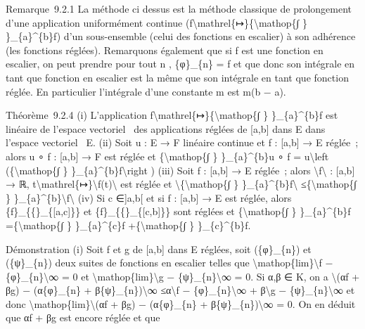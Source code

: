 \documentclass[]{article}
\begin{document}
Remarque~9.2.1 La méthode ci dessus est la méthode classique de
prolongement d'une application uniformément continue
(f\textbackslash{}mathrel\{↦\}\{\textbackslash{}mathop\{∫ \}
\}\_\{a\}\^{}\{b\}f) d'un sous-ensemble (celui des fonctions en
escalier) à son adhérence (les fonctions réglées). Remarquons également
que si f est une fonction en escalier, on peut prendre pour tout n ,
\{φ\}\_\{n\} = f et que donc son intégrale en tant que fonction en
escalier est la même que son intégrale en tant que fonction réglée. En
particulier l'intégrale d'une constante m est m(b − a).

Théorème~9.2.4 (i) L'application
f\textbackslash{}mathrel\{↦\}\{\textbackslash{}mathop\{∫ \}
\}\_\{a\}\^{}\{b\}f est linéaire de l'espace vectoriel ~des applications
réglées de {[}a,b{]} dans E dans l'espace vectoriel ~E. (ii) Soit u : E
→ F linéaire continue et f : {[}a,b{]} → E réglée~; alors u ∘ f :
{[}a,b{]} → F est réglée et \{\textbackslash{}mathop\{∫ \}
\}\_\{a\}\^{}\{b\}u ∘ f = u\textbackslash{}left
(\{\textbackslash{}mathop\{∫ \} \}\_\{a\}\^{}\{b\}f\textbackslash{}right
) (iii) Soit f : {[}a,b{]} → E réglée~; alors
\textbackslash{}\textbar{}f\textbackslash{}\textbar{} : {[}a,b{]} → ℝ,
t\textbackslash{}mathrel\{↦\}\textbackslash{}\textbar{}f(t)\textbackslash{}\textbar{}
est réglée et \textbackslash{}\textbar{}\{\textbackslash{}mathop\{∫ \}
\}\_\{a\}\^{}\{b\}f\textbackslash{}\textbar{}
≤\{\textbackslash{}mathop\{∫ \}
\}\_\{a\}\^{}\{b\}\textbackslash{}\textbar{}f\textbackslash{}\textbar{}
(iv) Si c ∈{]}a,b{[} et si f : {[}a,b{]} → E est réglée, alors
\{f\}\_\{\{\textbar{}\}\_\{{[}a,c{]}\}\} et
\{f\}\_\{\{\textbar{}\}\_\{{[}c,b{]}\}\} sont réglées et
\{\textbackslash{}mathop\{∫ \} \}\_\{a\}\^{}\{b\}f
=\{\textbackslash{}mathop\{∫ \} \}\_\{a\}\^{}\{c\}f
+\{\textbackslash{}mathop\{∫ \} \}\_\{c\}\^{}\{b\}f.

Démonstration (i) Soit f et g de {[}a,b{]} dans E réglées, soit
(\{φ\}\_\{n\}) et (\{ψ\}\_\{n\}) deux suites de fonctions en escalier
telles que \textbackslash{}mathop\{lim\}\textbackslash{}\textbar{}f −
\{φ\}\_\{n\}\textbackslash{}\textbar{}∞ = 0 et
\textbackslash{}mathop\{lim\}\textbackslash{}\textbar{}g −
\{ψ\}\_\{n\}\textbackslash{}\textbar{}∞ = 0. Si α,β ∈ K, on a
\textbackslash{}\textbar{}(αf + βg) − (α\{φ\}\_\{n\} +
β\{ψ\}\_\{n\})\textbackslash{}\textbar{}∞
≤\textbar{}α\textbar{}\textbackslash{}\textbar{}f −
\{φ\}\_\{n\}\textbackslash{}\textbar{}∞ +
\textbar{}β\textbar{}\textbackslash{}\textbar{}g −
\{ψ\}\_\{n\}\textbackslash{}\textbar{}∞ et donc
\textbackslash{}mathop\{lim\}\textbackslash{}\textbar{}(αf + βg) −
(α\{φ\}\_\{n\} + β\{ψ\}\_\{n\})\textbackslash{}\textbar{}∞ = 0. On en
déduit que αf + βg est encore réglée et que
\end{document}
